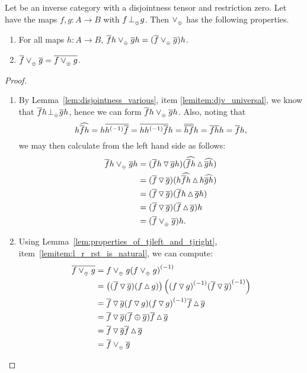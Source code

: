 \begin{lemma}\label{lem:tensor_disjoint_join_properties}
  Let \X be an inverse category with a disjointness tensor and restriction zero. Let \X have the
  maps $f,g: A \to B$ with $f{}_{{}_{}}{\perp_{{}_{\oplus}}} g$. Then $\vee_{{_{\oplus}}}$ has the following properties.
  \begin{enumerate}[{(}i{)}]
    \item For all maps $h:A \to B$, $\overline{f}h \vee_{{_{\oplus}}} \overline{g}h = (\overline{f}\vee_{{_{\oplus}}} \overline{g})h$.
      \label{lemitem:tdj_rst_universal}
    \item $\overline{f}\vee_{{_{\oplus}}} \overline{g} = \overline{f\vee_{{_{\oplus}}} g}$. \label{lemitem:tdj_rst_is_rst}
  \end{enumerate}
\end{lemma}
\begin{proof}
  \begin{enumerate}[{(}i{)}]
    \item By Lemma~\ref{lem:disjointness_various}, item \ref{lemitem:djv_universal}, we know that
    $\overline{f}h {}_{{}_{}}{\perp_{{}_{\oplus}}} \overline{g} h$, hence we can form $\overline{f}h \vee_{{_{\oplus}}} \overline{g}h$.
    Also, noting that
      \[
        h \widehat{\overline{f} h} = h \overline{{h}^{(-1)}\overline{f}} = \overline{h {h}^{(-1)} \overline{f}} h
          = \overline{\overline{h}\overline{f}} h = \overline{f} \overline{h}h = \overline{f} h,
      \]
      we may then calculate from the left hand side as follows:
      \begin{align*}
        \overline{f}h \vee_{{_{\oplus}}} \overline{g}h
          & = (\overline{f}h \operatorname{\triangledown} \overline{g} h) (\widehat{\overline{f}h}\operatorname{\vartriangle}\widehat{\overline{g} h})\\
          & = (\overline{f} \operatorname{\triangledown} \overline{g} ) (h\widehat{\overline{f}h}\operatorname{\vartriangle} h\widehat{\overline{g} h})\\
          & = (\overline{f} \operatorname{\triangledown} \overline{g} ) (\overline{f}h\operatorname{\vartriangle} \overline{g} h)\\
          & = (\overline{f} \operatorname{\triangledown} \overline{g} ) (\overline{f}\operatorname{\vartriangle} \overline{g} )h\\
          & = (\overline{f} \vee_{{_{\oplus}}} \overline{g} ) h.
      \end{align*}
    \item
    Using Lemma~\ref{lem:properties_of_tjleft_and_tjright}, item~\ref{lemitem:l_r_rst_is_natural},
    we can compute:
    \begin{align*}
      \overline{f\vee_{{_{\oplus}}} g} & = f \vee_{{_{\oplus}}} g {(f\vee_{{_{\oplus}}} g)}^{(-1)} \\
      & = \left((\overline{f} \operatorname{\triangledown} \overline{g})(f\operatorname{\vartriangle} g)\right)
             \left({(f\operatorname{\triangledown} g)}^{(-1)} {(\overline{f}\operatorname{\triangledown} \overline{g})}^{(-1)}\right)\\
      & = \overline{f}\operatorname{\triangledown}\overline{g}(f\operatorname{\triangledown} g) {(f\operatorname{\triangledown} g)}^{(-1)} \overline{f}\operatorname{\vartriangle} \overline{g}\\
      & = \overline{f}\operatorname{\triangledown}\overline{g}(\overline{f}\oplus \overline{g})\overline{f}\operatorname{\vartriangle} \overline{g}\\
      & = \overline{f}\operatorname{\triangledown}\overline{g}\overline{f}\operatorname{\vartriangle} \overline{g}\\
      & = \overline{f}\vee_{{_{\oplus}}}\overline{g}
    \end{align*}
  \end{enumerate}
\end{proof}


